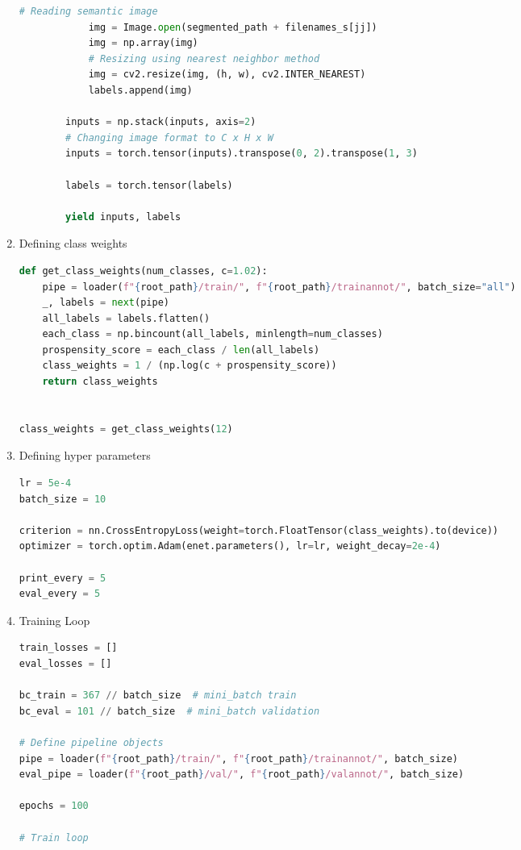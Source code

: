 \begin{enumerate}
\begin{lstlisting}[language=Python]
            # Reading semantic image
            img = Image.open(segmented_path + filenames_s[jj])
            img = np.array(img)
            # Resizing using nearest neighbor method
            img = cv2.resize(img, (h, w), cv2.INTER_NEAREST)
            labels.append(img)

        inputs = np.stack(inputs, axis=2)
        # Changing image format to C x H x W
        inputs = torch.tensor(inputs).transpose(0, 2).transpose(1, 3)

        labels = torch.tensor(labels)

        yield inputs, labels
\end{lstlisting}
    \item Defining class weights
          \begin{lstlisting}[language=Python]
def get_class_weights(num_classes, c=1.02):
    pipe = loader(f"{root_path}/train/", f"{root_path}/trainannot/", batch_size="all")
    _, labels = next(pipe)
    all_labels = labels.flatten()
    each_class = np.bincount(all_labels, minlength=num_classes)
    prospensity_score = each_class / len(all_labels)
    class_weights = 1 / (np.log(c + prospensity_score))
    return class_weights


class_weights = get_class_weights(12)
\end{lstlisting}
    \item Defining hyper parameters
          \begin{lstlisting}[language=Python]
lr = 5e-4
batch_size = 10

criterion = nn.CrossEntropyLoss(weight=torch.FloatTensor(class_weights).to(device))
optimizer = torch.optim.Adam(enet.parameters(), lr=lr, weight_decay=2e-4)

print_every = 5
eval_every = 5
                        \end{lstlisting}
    \item Training Loop
          \begin{lstlisting}[language=Python]
train_losses = []
eval_losses = []

bc_train = 367 // batch_size  # mini_batch train
bc_eval = 101 // batch_size  # mini_batch validation

# Define pipeline objects
pipe = loader(f"{root_path}/train/", f"{root_path}/trainannot/", batch_size)
eval_pipe = loader(f"{root_path}/val/", f"{root_path}/valannot/", batch_size)

epochs = 100

# Train loop


\end{lstlisting}
\end{enumerate}
